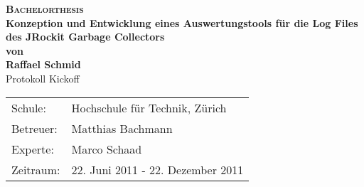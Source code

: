 \begin{titlepage}
\begin{center}
\textsc{\Huge \bf Bachelorthesis}\\[0.4cm]
\LARGE \textbf{Konzeption und Entwicklung eines Auswertungstools für die Log Files des JRockit Garbage Collectors}\\[1.0cm]
\large \textbf{von}\\[0.5cm]
\large \textbf{Raffael Schmid}\\[3cm]
\LARGE Protokoll Kickoff\\
\vspace{7cm}

\end{center}

\begin{tabular}[ht]{ll}
  Schule: & Hochschule für Technik, Zürich\\
  Betreuer: & Matthias Bachmann\\
  Experte: & Marco Schaad \\
  Zeitraum: & 22. Juni 2011 - 22. Dezember 2011
\end{tabular}
\end{titlepage}
